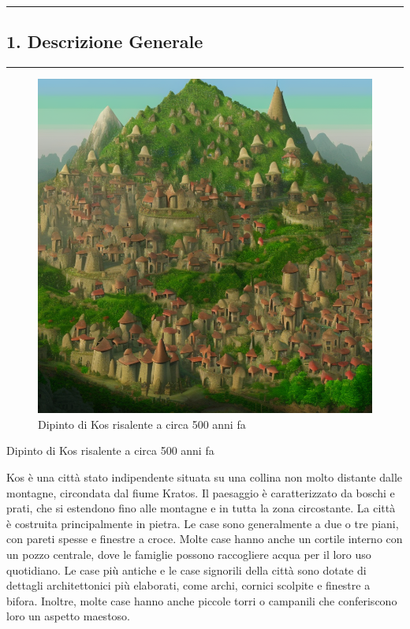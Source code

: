 \begin{center}\rule{0.5\linewidth}{0.5pt}\end{center}

\subsection{1. Descrizione Generale}\label{descrizione-generale}

\begin{center}\rule{0.5\linewidth}{0.5pt}\end{center}

\begin{figure}
\centering
\includegraphics{a-large-medieval-city-in-a-mountain-area--.png}
\caption{Dipinto di Kos risalente a circa 500 anni fa}
\end{figure}

Dipinto di Kos risalente a circa 500 anni fa

Kos è una città stato indipendente situata su una collina non molto
distante dalle montagne, circondata dal fiume Kratos. Il paesaggio è
caratterizzato da boschi e prati, che si estendono fino alle montagne e
in tutta la zona circostante. La città è costruita principalmente in
pietra. Le case sono generalmente a due o tre piani, con pareti spesse e
finestre a croce. Molte case hanno anche un cortile interno con un pozzo
centrale, dove le famiglie possono raccogliere acqua per il loro uso
quotidiano. Le case più antiche e le case signorili della città sono
dotate di dettagli architettonici più elaborati, come archi, cornici
scolpite e finestre a bifora. Inoltre, molte case hanno anche piccole
torri o campanili che conferiscono loro un aspetto maestoso.

